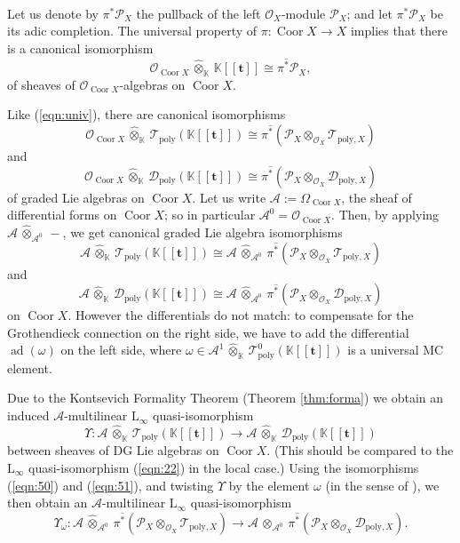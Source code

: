 \documentclass{conm-p-l}
\theoremstyle{definition}
\numberwithin{equation}{section}
\newcommand{\opn}{\operatorname}
\newcommand{\mcal}[1]{\mathcal{#1}}
\newcommand{\mrm}[1]{\mathrm{#1}}
\newcommand{\mbb}[1]{\mathbb{#1}}
\newcommand{\bsym}[1]{\boldsymbol{#1}}
\newcommand{\what}{\widehat}
\newcommand{\K}{\mbb{K}}
\newcommand{\hatotimes}[1]{\, \what{\otimes}_{#1} \,}
\begin{document}
Let us denote by $\pi^* \mcal{P}_X$ the pullback of the left 
$\mcal{O}_X$-module $\mcal{P}_X$; and let 
$\pi^{\what{*}} \mcal{P}_X$ be its adic completion. 
The universal property of 
$\pi : \opn{Coor} X \to X$ implies that there is a canonical isomorphism 
\begin{equation} \label{eqn:univ}
\mcal{O}_{\opn{Coor} X} \hatotimes{\K} \K[[\bsym{t}]]
\cong \pi^{\what{*}} \mcal{P}_X ,
\end{equation}
of sheaves of $\mcal{O}_{\opn{Coor} X}$-algebras on $\opn{Coor} X$. 

Like (\ref{eqn:univ}), there are canonical isomorphisms
\[ \mcal{O}_{\opn{Coor} X} \hatotimes{\K} 
\mcal{T}_{\mrm{poly}}(\K[[\bsym{t}]]) \cong
\pi^{\what{*}} (\mcal{P}_X \otimes_{\mcal{O}_X} 
\mcal{T}_{\mrm{poly}, X}) \]
and
\[ \mcal{O}_{\opn{Coor} X} \hatotimes{\K} 
\mcal{D}_{\mrm{poly}}(\K[[\bsym{t}]]) \cong 
\pi^{\what{*}} (\mcal{P}_X \otimes_{\mcal{O}_X} 
\mcal{D}_{\mrm{poly}, X}) \]
of graded Lie algebras on $\opn{Coor} X$. Let us write 
$\mcal{A} := \Omega_{\opn{Coor} X}$, the sheaf of differential forms on
$\opn{Coor} X$; so in particular 
$\mcal{A}^0 = \mcal{O}_{\opn{Coor} X}$.
Then, by applying $\mcal{A} \hatotimes{\mcal{A}^0} -$, we get canonical
graded Lie algebra isomorphisms 
\begin{equation} \label{eqn:50}
\mcal{A}  \hatotimes{\K} 
\mcal{T}_{\mrm{poly}}(\K[[\bsym{t}]]) \cong
\mcal{A} \hatotimes{\mcal{A}^0}
\pi^{\what{*}} (\mcal{P}_X \otimes_{\mcal{O}_X} 
\mcal{T}_{\mrm{poly}, X})
\end{equation}
and
\begin{equation} \label{eqn:51}
\mcal{A}  \hatotimes{\K} 
\mcal{D}_{\mrm{poly}}(\K[[\bsym{t}]]) \cong
\mcal{A} \hatotimes{\mcal{A}^0}
\pi^{\what{*}} (\mcal{P}_X \otimes_{\mcal{O}_X} 
\mcal{D}_{\mrm{poly}, X}) 
\end{equation}
on $\opn{Coor} X$. However the differentials do not match: to compensate for the
Grothen\-dieck connection on the right side, we have to add the differential 
$\opn{ad}(\omega)$ on the left side, where 
$\omega \in \mcal{A}^1 \hatotimes{\K} \mcal{T}^0_{\mrm{poly}}(\K[[\bsym{t}]])$
is a universal MC element.

Due to the Kontsevich Formality Theorem (Theorem \ref{thm:forma}) we obtain an
induced $\mcal{A}$-multilinear $\mrm{L}_{\infty}$ quasi-isomorphism
\[ \Upsilon : \mcal{A} \hatotimes{\K} 
\mcal{T}_{\mrm{poly}}(\K[[\bsym{t}]]) \to
\mcal{A} \hatotimes{\K} 
\mcal{D}_{\mrm{poly}}(\K[[\bsym{t}]])  \]
between sheaves of DG Lie algebras on $\opn{Coor} X$.
(This should be compared to the $\mrm{L}_{\infty}$ quasi-isomorphism 
(\ref{eqn:22}) in the local case.)
Using the isomorphisms (\ref{eqn:50}) and (\ref{eqn:51}), and twisting 
$\Upsilon$ by the element $\omega$ (in the sense of \cite[Theorem 3.2]{Ye3}), we
then
obtain an $\mcal{A}$-multilinear $\mrm{L}_{\infty}$ quasi-isomorphism
\[ \Upsilon_{\omega} : \mcal{A} \hatotimes{\mcal{A}^0}
\pi^{\what{*}} (\mcal{P}_X \otimes_{\mcal{O}_X} \mcal{T}_{\mrm{poly}, X}) \to 
\mcal{A} \hatotimes{\mcal{A}^0}
\pi^{\what{*}} (\mcal{P}_X \otimes_{\mcal{O}_X} \mcal{D}_{\mrm{poly}, X}) . \]
\end{document}
